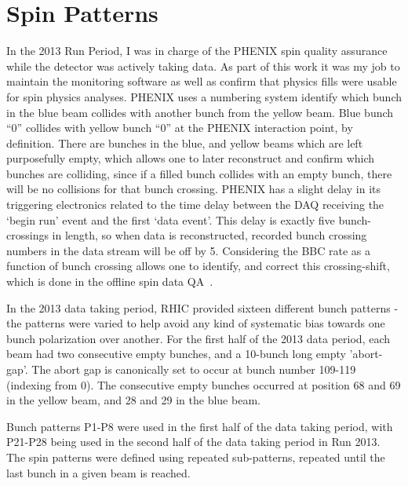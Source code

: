 \section{Spin Patterns}

In the 2013 Run Period, I was in charge of the PHENIX spin quality assurance
while the detector was actively taking data. As part of this work it was my job
to maintain the monitoring software as well as confirm that physics fills were
usable for spin physics analyses. PHENIX uses a numbering system identify which
bunch in the blue beam collides with another bunch from the yellow beam. Blue
bunch ``0'' collides with yellow bunch ``0'' at the PHENIX interaction point, by
definition.  There are bunches in the blue, and yellow beams which are left
purposefully empty, which allows one to later reconstruct and confirm which
bunches are colliding, since if a filled bunch collides with an empty bunch,
there will be no collisions for that bunch crossing. PHENIX has a slight delay
in its triggering electronics related to the time delay between the DAQ
receiving the `begin run' event and the first `data event'. This delay is
exactly five bunch-crossings in length, so when data is reconstructed, recorded
bunch crossing numbers in the data stream will be off by 5. Considering the
BBC rate as a function of bunch crossing allows one to identify, and correct
this crossing-shift, which is done in the offline spin data QA~\cite{Kim2014}.

In the 2013 data taking period, RHIC provided sixteen different bunch patterns -
the patterns were varied to help avoid any kind of systematic bias towards one
bunch polarization over another. For the first half of the 2013 data period,
each beam had two consecutive empty bunches, and a 10-bunch long empty
'abort-gap'. The abort gap is canonically set to occur at bunch number 109-119
(indexing from 0). The consecutive empty bunches occurred at position 68 and 69
in the yellow beam, and 28 and 29 in the blue beam.

Bunch patterns P1-P8 were used in the first half of the data taking period, with
P21-P28 being used in the second half of the data taking period in Run 2013.
The spin patterns were defined using repeated sub-patterns, repeated until the
last bunch in a given beam is reached.


